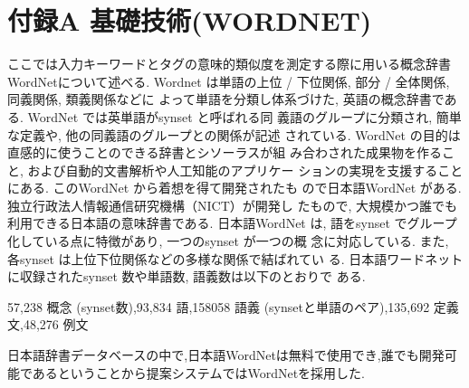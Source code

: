 \documentclass[sotsuron]{kuee}
\begin{document}
\chapter{付録A 基礎技術(WORDNET)}\label{chap:layout}
ここでは入力キーワードとタグの意味的類似度を測定する際に用いる概念辞書WordNetについて述べる.
Wordnet は単語の上位 / 下位関係, 部分 / 全体関係, 同義関係, 類義関係などに
よって単語を分類し体系づけた, 英語の概念辞書である\cite{3.1-1}.
WordNet では英単語がsynset と呼ばれる同
義語のグループに分類され, 簡単な定義や, 他の同義語のグループとの関係が記述
されている. WordNet の目的は直感的に使うことのできる辞書とシソーラスが組
み合わされた成果物を作ること, および自動的文書解析や人工知能のアプリケー
ションの実現を支援することにある. このWordNet から着想を得て開発されたも
ので日本語WordNet がある. 独立行政法人情報通信研究機構（NICT）が開発し
たもので, 大規模かつ誰でも利用できる日本語の意味辞書である. 日本語WordNet
は, 語をsynset でグループ化している点に特徴があり, 一つのsynset が一つの概
念に対応している. また, 各synset は上位下位関係などの多様な関係で結ばれてい
る. 日本語ワードネットに収録されたsynset 数や単語数, 語義数は以下のとおりで
ある.

57,238 概念 (synset数),93,834 語,158058 語義 (synsetと単語のペア),135,692 定義文,48,276 例文

日本語辞書データベースの中で,日本語WordNetは無料で使用でき,誰でも開発可能であるということから提案システムではWordNetを採用した.
\end{document}

